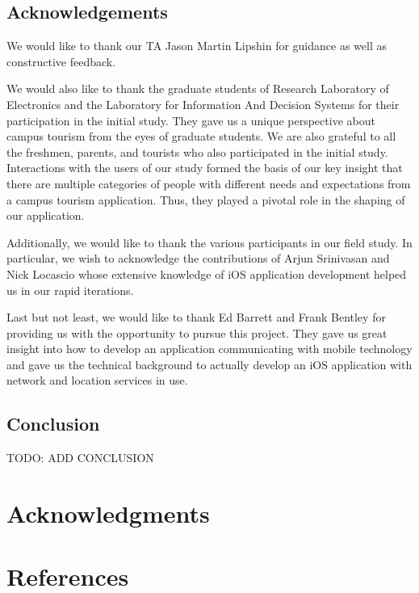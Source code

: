 \documentclass{sigchi}
\begin{document}
\subsection{Acknowledgements}

We would like to thank our TA Jason Martin Lipshin for guidance as well as constructive feedback. 

We would also like to thank the graduate students of Research Laboratory of Electronics and the Laboratory for Information And Decision Systems for their participation in the initial study. They gave us a unique perspective about campus tourism from the eyes of graduate students. We are also grateful to all the freshmen, parents, and tourists who also participated in the initial study. Interactions with the users of our study formed the basis of our key insight that there are multiple categories of people with different needs and expectations from a campus tourism application. Thus, they played a pivotal role in the shaping of our application. 

Additionally, we would like to thank the various participants in our field study. In particular, we wish to acknowledge the contributions of Arjun Srinivasan and Nick Locascio whose extensive knowledge of iOS application development helped us in our rapid iterations. 

Last but not least, we would like to thank Ed Barrett and Frank Bentley for providing us with the opportunity to pursue this project. They gave us great insight into how to develop an
application communicating with mobile technology and gave us the technical background to actually develop an iOS application with network and location services in use. 

\subsection{Conclusion}

TODO: ADD CONCLUSION

\section{Acknowledgments}

%
%
%
%
%
\balance

\section{References}



\end{document}
